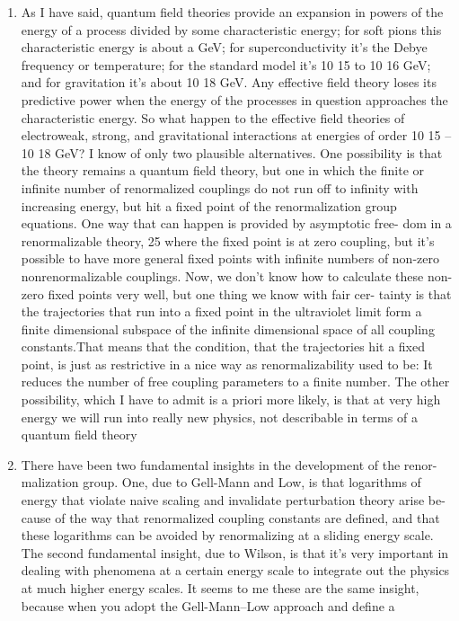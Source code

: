 \begin{enumerate}
	\item As I have said, quantum field theories provide an expansion in powers
	of the energy of a process divided by some characteristic energy; for soft
	pions this characteristic energy is about a GeV; for superconductivity it’s
	the Debye frequency or temperature; for the standard model it’s 10 15 to 10 16
	GeV; and for gravitation it’s about 10 18 GeV. Any effective field theory loses
	its predictive power when the energy of the processes in question approaches
	the characteristic energy. So what happen to the effective field theories of
	electroweak, strong, and gravitational interactions at energies of order 10 15 –
	10 18 GeV? I know of only two plausible alternatives.
	One possibility is that the theory remains a quantum field theory, but one
	in which the finite or infinite number of renormalized couplings do not run off
	to infinity with increasing energy, but hit a fixed point of the renormalization
	group equations. One way that can happen is provided by asymptotic free-
	dom in a renormalizable theory, 25 where the fixed point is at zero coupling,
	but it’s possible to have more general fixed points with infinite numbers of
	non-zero nonrenormalizable couplings. Now, we don’t know how to calculate
	these non-zero fixed points very well, but one thing we know with fair cer-
	tainty is that the trajectories that run into a fixed point in the ultraviolet
	limit form a finite dimensional subspace of the infinite dimensional space of
	all coupling constants.That means that the condition, that the trajectories hit a fixed point, is just as restrictive in a nice way as renormalizability used to be:
	It reduces the number of free coupling parameters to a finite number.  The other possibility, which I have to admit is a priori more likely, is that
	at very high energy we will run into really new physics, not describable in
	terms of a quantum field theory
	\item There have been two fundamental insights in the development of the renor-
	malization group. One, due to Gell-Mann and Low, is that logarithms of
	energy that violate naive scaling and invalidate perturbation theory arise be-
	cause of the way that renormalized coupling constants are defined, and that
	these logarithms can be avoided by renormalizing at a sliding energy scale.
	The second fundamental insight, due to Wilson, is that it’s very important
	in dealing with phenomena at a certain energy scale to integrate out the
	physics at much higher energy scales. It seems to me these are the same
	insight, because when you adopt the Gell-Mann–Low approach and define a

\end{enumerate}
